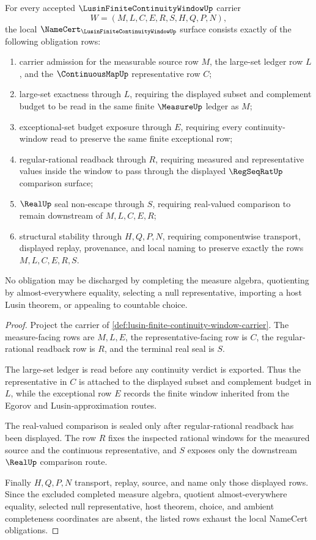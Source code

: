 \begin{theorem}\label{thm:lusin-finite-continuity-window-namecert-obligations}
For every accepted $\LusinFiniteContinuityWindowUp$ carrier
$$
W=(M,L,C,E,R,S,H,Q,P,N),
$$
the local $\NameCert_{\LusinFiniteContinuityWindowUp}$ surface consists exactly of the following obligation rows:
\begin{enumerate}
\item carrier admission for the measurable source row $M$, the large-set ledger row $L$, and the $\ContinuousMapUp$ representative row $C$;
\item large-set exactness through $L$, requiring the displayed subset and complement budget to be read in the same finite $\MeasureUp$ ledger as $M$;
\item exceptional-set budget exposure through $E$, requiring every continuity-window read to preserve the same finite exceptional row;
\item regular-rational readback through $R$, requiring measured and representative values inside the window to pass through the displayed $\RegSeqRatUp$ comparison surface;
\item $\RealUp$ seal non-escape through $S$, requiring real-valued comparison to remain downstream of $M,L,C,E,R$;
\item structural stability through $H,Q,P,N$, requiring componentwise transport, displayed replay, provenance, and local naming to preserve exactly the rows $M,L,C,E,R,S$.
\end{enumerate}
No obligation may be discharged by completing the measure algebra, quotienting by almost-everywhere equality, selecting a null representative, importing a host Lusin theorem, or appealing to countable choice.
\end{theorem}
\begin{proof}
Project the carrier of \autoref{def:lusin-finite-continuity-window-carrier}. The measure-facing rows are $M,L,E$, the representative-facing row is $C$, the regular-rational readback row is $R$, and the terminal real seal is $S$.

The large-set ledger is read before any continuity verdict is exported. Thus the representative in $C$ is attached to the displayed subset and complement budget in $L$, while the exceptional row $E$ records the finite window inherited from the Egorov and Lusin-approximation routes.

The real-valued comparison is sealed only after regular-rational readback has been displayed. The row $R$ fixes the inspected rational windows for the measured source and the continuous representative, and $S$ exposes only the downstream $\RealUp$ comparison route.

Finally $H,Q,P,N$ transport, replay, source, and name only those displayed rows. Since the excluded completed measure algebra, quotient almost-everywhere equality, selected null representative, host theorem, choice, and ambient completeness coordinates are absent, the listed rows exhaust the local NameCert obligations.
\end{proof}


